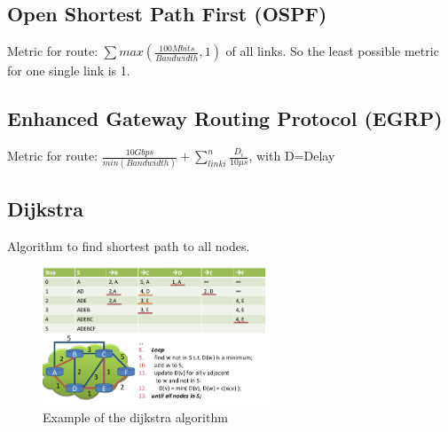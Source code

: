 \documentclass{article}
\begin{document}
\subsection{Open Shortest Path First (OSPF)}
Metric for route: $\sum{max (\frac{100 Mbits}{Bandwidth}, 1)}$ of all links. So the least possible metric for one single link is 1.

\subsection{Enhanced Gateway Routing Protocol (EGRP)}
Metric for route: $ \frac{10 Gbps}{min(Bandwidth)} + \sum\limits_{link i}^{n} \frac{D_i}{10\mu s}$, with D=Delay

\subsection{Dijkstra}
Algorithm to find shortest path to all nodes.

\begin{figure}[h]
    \centering
    \includegraphics[width=0.6\textwidth]{media/dijkstra.png}
    \caption{Example of the dijkstra algorithm}
    \label{fig:dijkstra}
\end{figure}
\end{document}
